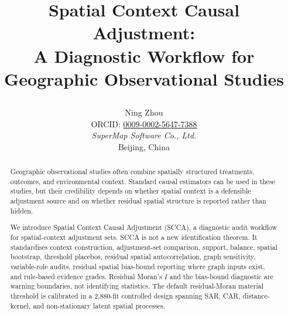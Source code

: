 \documentclass{article}
\begin{document}
\title{\parbox{0.9\textwidth}{\centering Spatial Context Causal Adjustment:\\A Diagnostic Workflow for Geographic Observational Studies}}

\author{Ning Zhou\\
\small ORCID: \href{https://orcid.org/0009-0002-5647-7388}{0009-0002-5647-7388}\\
\small {\em SuperMap Software Co., Ltd.}\\
\small Beijing, China}

\date{}
\maketitle

\begin{abstract}
Geographic observational studies often combine spatially structured treatments, outcomes, and environmental context. Standard causal estimators can be used in these studies, but their credibility depends on whether spatial context is a defensible adjustment source and on whether residual spatial structure is reported rather than hidden.

We introduce Spatial Context Causal Adjustment (SCCA), a diagnostic audit workflow for spatial-context adjustment sets. SCCA is not a new identification theorem. It standardises context construction, adjustment-set comparison, support, balance, spatial bootstrap, threshold placebos, residual spatial autocorrelation, graph sensitivity, variable-role audits, residual spatial bias-bound reporting where graph inputs exist, and rule-based evidence grades. Residual Moran's $I$ and the bias-bound diagnostic are warning boundaries, not identifying statistics. The default residual-Moran material threshold is calibrated in a 2{,}880-fit controlled design spanning SAR, CAR, distance-kernel, and non-stationary latent spatial processes.


\end{abstract}
\end{document}

